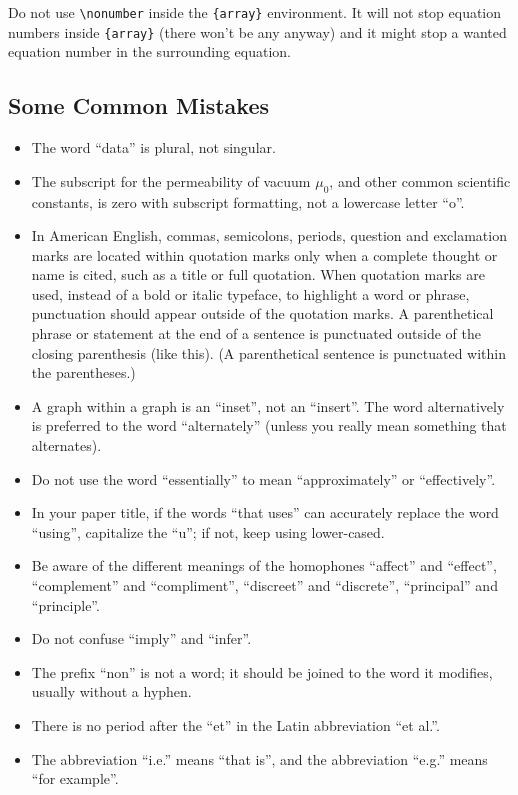\documentclass[conference]{IEEEtran}
\begin{document}
Do not use \verb|\nonumber| inside the \verb|{array}| environment. It
will not stop equation numbers inside \verb|{array}| (there won't be
any anyway) and it might stop a wanted equation number in the
surrounding equation.

\subsection{Some Common Mistakes}\label{SCM}
\begin{itemize}
\item The word ``data'' is plural, not singular.
\item The subscript for the permeability of vacuum $\mu_{0}$, and other common scientific constants, is zero with subscript formatting, not a lowercase letter ``o''.
\item In American English, commas, semicolons, periods, question and exclamation marks are located within quotation marks only when a complete thought or name is cited, such as a title or full quotation. When quotation marks are used, instead of a bold or italic typeface, to highlight a word or phrase, punctuation should appear outside of the quotation marks. A parenthetical phrase or statement at the end of a sentence is punctuated outside of the closing parenthesis (like this). (A parenthetical sentence is punctuated within the parentheses.)
\item A graph within a graph is an ``inset'', not an ``insert''. The word alternatively is preferred to the word ``alternately'' (unless you really mean something that alternates).
\item Do not use the word ``essentially'' to mean ``approximately'' or ``effectively''.
\item In your paper title, if the words ``that uses'' can accurately replace the word ``using'', capitalize the ``u''; if not, keep using lower-cased.
\item Be aware of the different meanings of the homophones ``affect'' and ``effect'', ``complement'' and ``compliment'', ``discreet'' and ``discrete'', ``principal'' and ``principle''.
\item Do not confuse ``imply'' and ``infer''.
\item The prefix ``non'' is not a word; it should be joined to the word it modifies, usually without a hyphen.
\item There is no period after the ``et'' in the Latin abbreviation ``et al.''.
\item The abbreviation ``i.e.'' means ``that is'', and the abbreviation ``e.g.'' means ``for example''.
\end{itemize}
\end{document}
